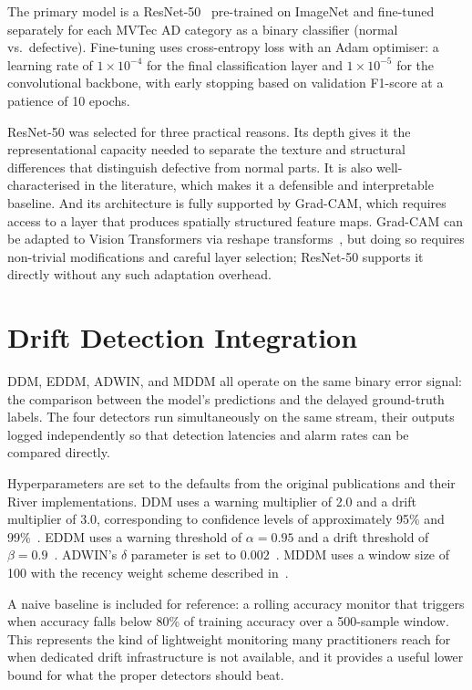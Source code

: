 The primary model is a ResNet-50~\autocite{He2016} pre-trained on ImageNet and fine-tuned separately for each MVTec AD category as a binary classifier (normal vs.\ defective). Fine-tuning uses cross-entropy loss with an Adam optimiser: a learning rate of $1 \times 10^{-4}$ for the final classification layer and $1 \times 10^{-5}$ for the convolutional backbone, with early stopping based on validation F1-score at a patience of 10 epochs.

ResNet-50 was selected for three practical reasons. Its depth gives it the representational capacity needed to separate the texture and structural differences that distinguish defective from normal parts. It is also well-characterised in the literature, which makes it a defensible and interpretable baseline. And its architecture is fully supported by Grad-CAM, which requires access to a layer that produces spatially structured feature maps. Grad-CAM can be adapted to Vision Transformers via reshape transforms~\autocite{Selvaraju2017}, but doing so requires non-trivial modifications and careful layer selection; ResNet-50 supports it directly without any such adaptation overhead.

\section{Drift Detection Integration}
\label{sec:dd-integration}

DDM, EDDM, ADWIN, and MDDM all operate on the same binary error signal: the comparison between the model's predictions and the delayed ground-truth labels. The four detectors run simultaneously on the same stream, their outputs logged independently so that detection latencies and alarm rates can be compared directly.

Hyperparameters are set to the defaults from the original publications and their River implementations. DDM uses a warning multiplier of 2.0 and a drift multiplier of 3.0, corresponding to confidence levels of approximately 95\% and 99\%~\autocite{Gama2004}. EDDM uses a warning threshold of $\alpha = 0.95$ and a drift threshold of $\beta = 0.9$~\autocite{baena2006early}. ADWIN's $\delta$ parameter is set to $0.002$~\autocite{Bifet2007}. MDDM uses a window size of 100 with the recency weight scheme described in~\textcite{Pesaranghader2018}.

A naive baseline is included for reference: a rolling accuracy monitor that triggers when accuracy falls below 80\% of training accuracy over a 500-sample window. This represents the kind of lightweight monitoring many practitioners reach for when dedicated drift infrastructure is not available, and it provides a useful lower bound for what the proper detectors should beat.

